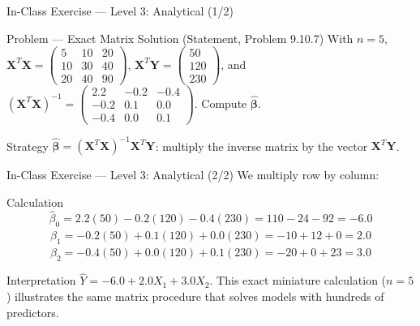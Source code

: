 \documentclass[10pt, aspectratio=169]{beamer}
\begin{document}
\begin{frame}{In-Class Exercise --- Level 3: Analytical (1/2)}
  \footnotesize
  \begin{block}{Problem --- Exact Matrix Solution (Statement, Problem 9.10.7)}
    With $n=5$, $\mathbf{X}^T\mathbf{X}=\begin{pmatrix}5&10&20\\10&30&40\\20&40&90\end{pmatrix}$, $\mathbf{X}^T\mathbf{Y}=\begin{pmatrix}50\\120\\230\end{pmatrix}$, and $(\mathbf{X}^T\mathbf{X})^{-1}=\begin{pmatrix}2.2&-0.2&-0.4\\-0.2&0.1&0.0\\-0.4&0.0&0.1\end{pmatrix}$. Compute $\hat{\boldsymbol\beta}$.
  \end{block}

  \vspace{0.1cm}
  \pause
  \begin{alertblock}{Strategy}
    \scriptsize
    $\hat{\boldsymbol\beta}=(\mathbf{X}^T\mathbf{X})^{-1}\mathbf{X}^T\mathbf{Y}$: multiply the inverse matrix by the vector $\mathbf{X}^T\mathbf{Y}$.
  \end{alertblock}
\end{frame}

\begin{frame}{In-Class Exercise --- Level 3: Analytical (2/2)}
  \scriptsize
  We multiply row by column: \pause

  \vspace{0.05cm}
  \begin{block}{Calculation}
    \scriptsize
    $$\hat\beta_0=2.2(50)-0.2(120)-0.4(230)=110-24-92=-6.0$$
    $$\hat\beta_1=-0.2(50)+0.1(120)+0.0(230)=-10+12+0=2.0$$
    $$\hat\beta_2=-0.4(50)+0.0(120)+0.1(230)=-20+0+23=3.0$$
  \end{block}

  \vspace{0.05cm}
  \pause
  \begin{alertblock}{Interpretation}
    $\hat Y=-6.0+2.0X_1+3.0X_2$. This exact miniature calculation ($n=5$) illustrates the same matrix procedure that solves models with hundreds of predictors.
  \end{alertblock}
\end{frame}
\end{document}

